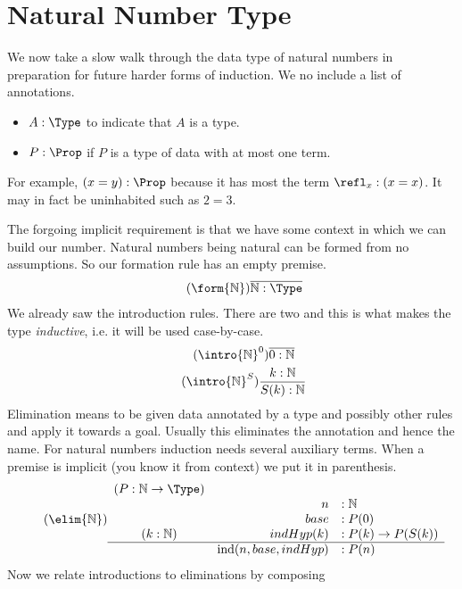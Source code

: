 
\section{Natural Number Type}
We now take a slow walk through the data type of natural numbers 
in preparation for future harder forms of induction.  We 
no include a list of annotations.
\begin{itemize}
\item     $A:\Type$ to indicate that $A$ is a type.
\item $P:\Prop$ if $P$ is a type of data with at most one term.
\end{itemize}
For example, $(x=y):\Prop$ because it has most the term $\refl_x:(x=x)$.
It may in fact be uninhabited such as $2=3$.

The forgoing implicit requirement is that we have 
some context in which we can build our number.  Natural 
numbers being natural can be formed from no assumptions.
So our formation rule has an empty premise.
\begin{gather}
\tag{$\form{\mathbb{N}}$}
    \overline{\mathbb{N}:\Type}
\end{gather}
We already saw the introduction rules.  There are two 
and this is what makes the type \emph{inductive}, i.e. 
it will be used case-by-case.
\begin{gather}
\tag{$\intro{\mathbb{N}}^0$}
    \overline{0:\mathbb{N}}
\\
\tag{$\intro{\mathbb{N}}^S$}
    \frac{k:\mathbb{N}}{S(k):\mathbb{N}}    
\end{gather}
Elimination means to be given data annotated by a type 
and possibly other rules and apply it towards a goal.
Usually this eliminates the annotation and hence the name.
For natural numbers induction needs several auxiliary terms.
When a premise is implicit (you know it from context) we 
put it in parenthesis.
\begin{gather}
\tag{$\elim{\mathbb{N}}$}
    \begin{array}{crl}
    (P:\mathbb{N}\to \Type) && \\
        & n & :\mathbb{N}\\        
        & base & : P(0)\\
    (k:\mathbb{N})    & indHyp(k) &: P(k)\to P(S(k))\\
    \hline 
        & \text{ind}(n,base,indHyp) & : P(n)
    \end{array}
\end{gather}
Now we relate introductions to eliminations by composing 
